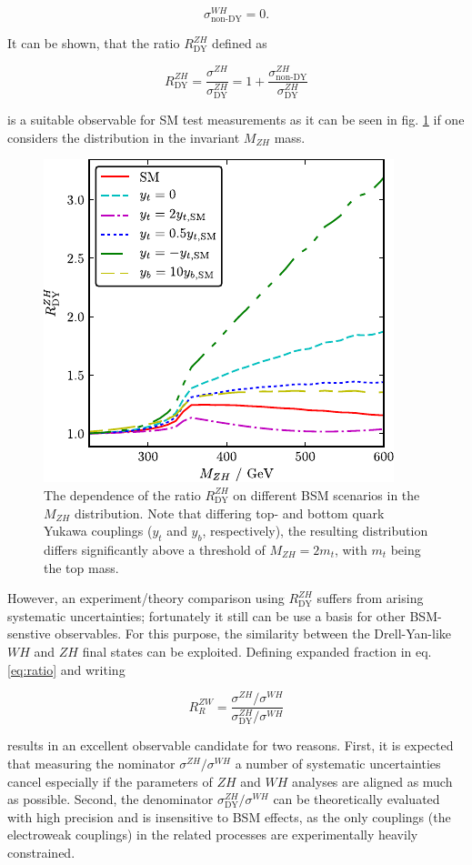 \begin{equation*}
	\sigma^{WH}_\text{non-DY} = 0.
\end{equation*}

It can be shown, that the ratio $R^{ZH}_\text{DY}$ defined as

\begin{equation}
	R^{ZH}_\text{DY} = \frac{\sigma^{ZH}}{\sigma^{ZH}_\text{DY}} = 1 + \frac{\sigma^{ZH}_\text{non-DY}}{\sigma^{ZH}_\text{DY}}
	\label{eq:ratio}
\end{equation}

is a suitable observable for SM test measurements as it can be seen in fig. \ref{fig:RZH} if one considers the distribution in the invariant $M_{ZH}$ mass.

\begin{figure}[h!]
	\centering
	\includegraphics[width=0.6\linewidth]{figures/theory/RZH.pdf}
	\caption{The dependence of the ratio $R^{ZH}_\text{DY}$ on different BSM scenarios in the $M_{ZH}$ distribution. Note that differing top- and bottom quark Yukawa couplings ($y_t$ and $y_b$, respectively), the resulting distribution differs significantly above a threshold of $M_{ZH}=2m_t$, with $m_t$ being the top mass.}
	\label{fig:RZH}
\end{figure}

However, an experiment/theory comparison using $R^{ZH}_\text{DY}$ suffers from arising systematic uncertainties; fortunately it still can be use a basis for other BSM-senstive observables. For this purpose, the similarity between the Drell-Yan-like $WH$ and $ZH$ final states can be exploited. Defining expanded fraction in eq. \ref{eq:ratio} and writing

\begin{equation}
	R^{ZW}_R = \frac{\sigma^{ZH}/\sigma^{WH}}{\sigma^{ZH}_\text{DY}/\sigma^{WH}}
\end{equation}

results in an excellent observable candidate for two reasons. First, it is expected that measuring the nominator $\sigma^{ZH}/\sigma^{WH}$ a number of systematic uncertainties cancel especially if the parameters of $ZH$ and $WH$ analyses are aligned as much as possible. Second, the denominator $\sigma^{ZH}_\text{DY}/\sigma^{WH}$ can be theoretically evaluated with high precision and is insensitive to BSM effects, as the only couplings (the electroweak couplings) in the related processes are experimentally heavily constrained.
